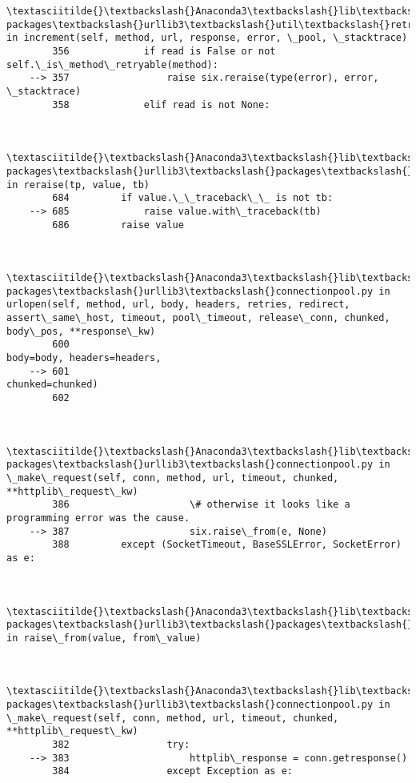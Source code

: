 \documentclass[11pt]{article}
\begin{document}
\begin{Verbatim}[commandchars=\\\{\}]
        \textasciitilde{}\textbackslash{}Anaconda3\textbackslash{}lib\textbackslash{}site-packages\textbackslash{}urllib3\textbackslash{}util\textbackslash{}retry.py in increment(self, method, url, response, error, \_pool, \_stacktrace)
        356             if read is False or not self.\_is\_method\_retryable(method):
    --> 357                 raise six.reraise(type(error), error, \_stacktrace)
        358             elif read is not None:
    

        \textasciitilde{}\textbackslash{}Anaconda3\textbackslash{}lib\textbackslash{}site-packages\textbackslash{}urllib3\textbackslash{}packages\textbackslash{}six.py in reraise(tp, value, tb)
        684         if value.\_\_traceback\_\_ is not tb:
    --> 685             raise value.with\_traceback(tb)
        686         raise value
    

        \textasciitilde{}\textbackslash{}Anaconda3\textbackslash{}lib\textbackslash{}site-packages\textbackslash{}urllib3\textbackslash{}connectionpool.py in urlopen(self, method, url, body, headers, retries, redirect, assert\_same\_host, timeout, pool\_timeout, release\_conn, chunked, body\_pos, **response\_kw)
        600                                                   body=body, headers=headers,
    --> 601                                                   chunked=chunked)
        602 
    

        \textasciitilde{}\textbackslash{}Anaconda3\textbackslash{}lib\textbackslash{}site-packages\textbackslash{}urllib3\textbackslash{}connectionpool.py in \_make\_request(self, conn, method, url, timeout, chunked, **httplib\_request\_kw)
        386                     \# otherwise it looks like a programming error was the cause.
    --> 387                     six.raise\_from(e, None)
        388         except (SocketTimeout, BaseSSLError, SocketError) as e:
    

        \textasciitilde{}\textbackslash{}Anaconda3\textbackslash{}lib\textbackslash{}site-packages\textbackslash{}urllib3\textbackslash{}packages\textbackslash{}six.py in raise\_from(value, from\_value)
    

        \textasciitilde{}\textbackslash{}Anaconda3\textbackslash{}lib\textbackslash{}site-packages\textbackslash{}urllib3\textbackslash{}connectionpool.py in \_make\_request(self, conn, method, url, timeout, chunked, **httplib\_request\_kw)
        382                 try:
    --> 383                     httplib\_response = conn.getresponse()
        384                 except Exception as e:
    


\end{Verbatim}
\end{document}
